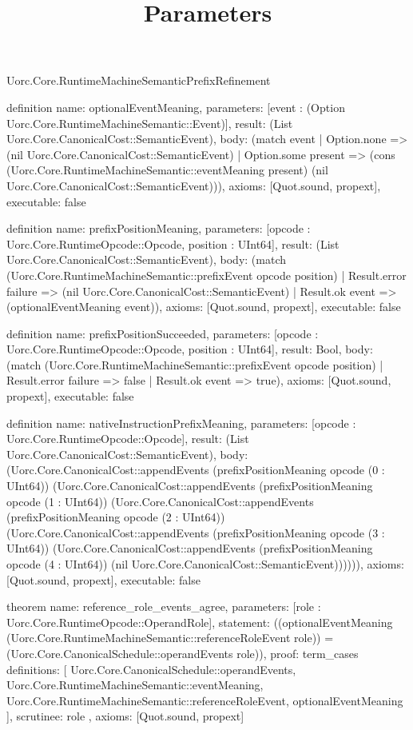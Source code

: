 \begin{lexlean}{Uorc.Core.RuntimeMachineSemanticPrefixRefinement}
\title{Parameters}
\begin{semanticmodule}
definition{
  name: optionalEventMeaning,
  parameters: [event : (Option Uorc.Core.RuntimeMachineSemantic::Event)],
  result: (List Uorc.Core.CanonicalCost::SemanticEvent),
  body: (match event
    | Option.none => (nil Uorc.Core.CanonicalCost::SemanticEvent)
    | Option.some present => (cons (Uorc.Core.RuntimeMachineSemantic::eventMeaning present) (nil Uorc.Core.CanonicalCost::SemanticEvent))),
  axioms: [Quot.sound, propext],
  executable: false
}

definition{
  name: prefixPositionMeaning,
  parameters: [opcode : Uorc.Core.RuntimeOpcode::Opcode, position : UInt64],
  result: (List Uorc.Core.CanonicalCost::SemanticEvent),
  body: (match (Uorc.Core.RuntimeMachineSemantic::prefixEvent opcode position)
    | Result.error failure => (nil Uorc.Core.CanonicalCost::SemanticEvent)
    | Result.ok event => (optionalEventMeaning event)),
  axioms: [Quot.sound, propext],
  executable: false
}

definition{
  name: prefixPositionSucceeded,
  parameters: [opcode : Uorc.Core.RuntimeOpcode::Opcode, position : UInt64],
  result: Bool,
  body: (match (Uorc.Core.RuntimeMachineSemantic::prefixEvent opcode position)
    | Result.error failure => false
    | Result.ok event => true),
  axioms: [Quot.sound, propext],
  executable: false
}

definition{
  name: nativeInstructionPrefixMeaning,
  parameters: [opcode : Uorc.Core.RuntimeOpcode::Opcode],
  result: (List Uorc.Core.CanonicalCost::SemanticEvent),
  body: (Uorc.Core.CanonicalCost::appendEvents (prefixPositionMeaning opcode (0 : UInt64)) (Uorc.Core.CanonicalCost::appendEvents (prefixPositionMeaning opcode (1 : UInt64)) (Uorc.Core.CanonicalCost::appendEvents (prefixPositionMeaning opcode (2 : UInt64)) (Uorc.Core.CanonicalCost::appendEvents (prefixPositionMeaning opcode (3 : UInt64)) (Uorc.Core.CanonicalCost::appendEvents (prefixPositionMeaning opcode (4 : UInt64)) (nil Uorc.Core.CanonicalCost::SemanticEvent)))))),
  axioms: [Quot.sound, propext],
  executable: false
}

theorem{
  name: reference_role_events_agree,
  parameters: [role : Uorc.Core.RuntimeOpcode::OperandRole],
  statement: ((optionalEventMeaning (Uorc.Core.RuntimeMachineSemantic::referenceRoleEvent role)) = (Uorc.Core.CanonicalSchedule::operandEvents role)),
  proof: term_cases{
    definitions: [
      Uorc.Core.CanonicalSchedule::operandEvents,
      Uorc.Core.RuntimeMachineSemantic::eventMeaning,
      Uorc.Core.RuntimeMachineSemantic::referenceRoleEvent,
      optionalEventMeaning
    ],
    scrutinee: role
  },
  axioms: [Quot.sound, propext]
}


\end{semanticmodule}
\end{lexlean}
